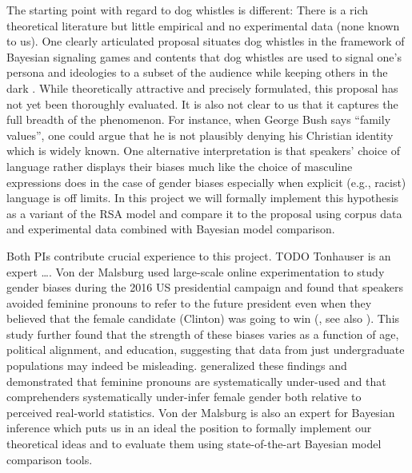 \documentclass[11pt]{article}
\begin{document}
The starting point with regard to dog whistles is different: There is a rich theoretical literature but little empirical and no experimental data (none known to us).  One clearly articulated proposal situates dog whistles in the framework of Bayesian signaling games \parencite{Burnett2017} and contents that dog whistles are used to signal one’s persona and ideologies to a subset of the audience while keeping others in the dark \parencite{HendersonMcCready2018, HendersonMcCready2019}.  While theoretically attractive and precisely formulated, this proposal has not yet been thoroughly evaluated.  It is also not clear to us that it captures the full breadth of the phenomenon.  For instance, when George Bush says “family values”, one could argue that he is not plausibly denying his Christian identity which is widely known.  One alternative interpretation is that speakers’ choice of language rather displays their biases much like the choice of masculine expressions does in the case of gender biases especially when explicit (e.g., racist) language is off limits.  In this project we will formally implement this hypothesis as a variant of the RSA model and compare it to the \citeauthor{HendersonMcCready2019} proposal using corpus data and experimental data combined with Bayesian model comparison.

Both PIs contribute crucial experience to this project.  TODO Tonhauser is an expert ….  Von der Malsburg used large-scale online experimentation to study gender biases during the 2016 US presidential campaign and found that speakers avoided feminine pronouns to refer to the future president even when they believed that the female candidate (Clinton) was going to win (\cite{MalsburgEtAl2020}, see also \cite{PoppelsEtAl2021CUNY, PozniakBurnett2021}).  This study further found that the strength of these biases varies as a function of age, political alignment, and education, suggesting that data from just undergraduate populations may indeed be misleading.  \textcite{BoyceEtAl2019LSA} generalized these findings and demonstrated that feminine pronouns are systematically under-used and that comprehenders systematically under-infer female gender both relative to perceived real-world statistics.  Von der Malsburg is also an expert for Bayesian inference \parencite{MorganEtAl2020, MeziereEtAl2021} which puts us in an ideal the position to formally implement our theoretical ideas and to evaluate them using state-of-the-art Bayesian model comparison tools.

%
\end{document}
